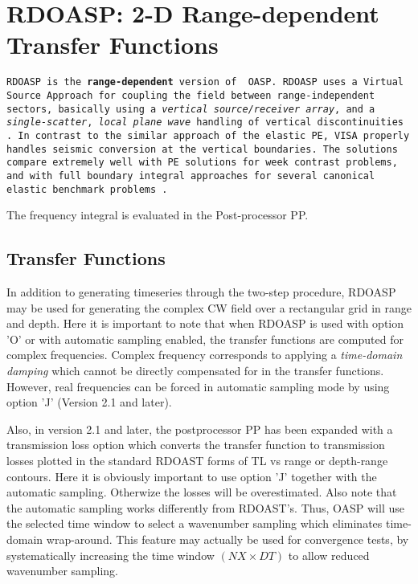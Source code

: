 \section{RDOASP: 2-D Range-dependent Transfer Functions}

\tt RDOASP \rm is the {\bf range-dependent} version of \tt
OASP. \rm 
\tt RDOASP \rm uses a Virtual Source Approach
for coupling the field between range-independent
sectors, basically using a {\em vertical source/receiver array}, and a
{\em single-scatter}, {\em local plane wave} handling of vertical
discontinuities \cite{Goh_97}. In contrast to the similar approach of the elastic PE, VISA properly handles seismic conversion at the vertical boundaries.
The solutions compare
extremely well with PE solutions for week contrast problems, and with full boundary integral approaches for several canonical elastic
benchmark problems \cite{Goh_96,Goh_97}.

The frequency integral is evaluated in the
Post-processor PP.  

\subsection{Transfer Functions}

In addition to generating timeseries through the two-step procedure,
RDOASP may be used for generating the complex CW field over a
rectangular grid in range and depth. Here it is important to note that
when RDOASP is used with option 'O' or with automatic
sampling enabled, the transfer functions are computed for complex
frequencies. Complex frequency corresponds to applying a {\em
time-domain damping} which cannot be directly compensated for in the
transfer functions. However, real frequencies can be forced in
automatic sampling mode by using option 'J' (Version 2.1 and later).

Also, in version 2.1 and later, the postprocessor PP has been expanded
with a transmission loss option which converts the transfer function
to transmission losses plotted in the standard RDOAST forms of TL vs
range or depth-range contours. Here it is obviously important to use option 'J'
together with the automatic sampling. Otherwize the losses will be
overestimated. Also note that the automatic sampling works differently
from RDOAST's. Thus, OASP will use the selected time window to select a
wavenumber sampling which eliminates time-domain wrap-around. This
feature may actually be used for convergence tests, by systematically
increasing the time window $ (NX \times DT) $ to allow reduced
wavenumber sampling.
  
